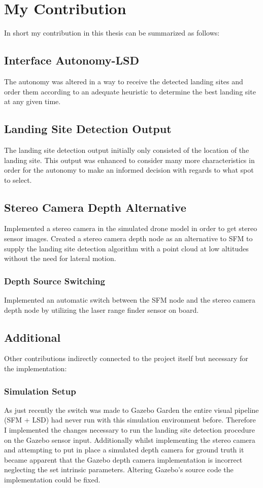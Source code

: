 \chapter{My Contribution}

In short my contribution in this thesis can be summarized as follows:

\section{Interface Autonomy-LSD}
The autonomy was altered in a way to receive the detected landing sites and order them according to an adequate heuristic to determine the best landing site at any given time.
\section{Landing Site Detection Output}
The landing site detection output initially only consisted of the location of the landing site. This output was enhanced to consider many more characteristics in order for the autonomy to make an informed decision with regards to what spot to select.
\section{Stereo Camera Depth Alternative}
Implemented a stereo camera in the simulated drone model in order to get stereo sensor images. Created a stereo camera depth node as an alternative to SFM to supply the landing site detection algorithm with a point cloud at low altitudes without the need for lateral motion. 
\subsection{Depth Source Switching}
Implemented an automatic switch between the SFM node and the stereo camera depth node by utilizing the laser range finder sensor on board.
\section{Additional}
Other contributions indirectly connected to the project itself but necessary for the implementation:
\subsection{Simulation Setup}
As just recently the switch was made to Gazebo Garden the entire visual pipeline (SFM + LSD) had never run with this simulation environment before. Therefore I implemented the changes necessary to run the landing site detection procedure on the Gazebo sensor input. Additionally whilst implementing the stereo camera and attempting to put in place a simulated depth camera for ground truth it became apparent that the Gazebo depth camera implementation is incorrect neglecting the set intrinsic parameters. Altering Gazebo's source code the implementation could be fixed.
